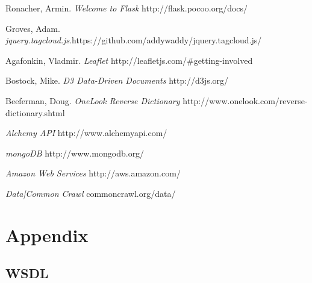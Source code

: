 \documentclass[conference]{IEEEtran}
\begin{document}
\begin{thebibliography}{1}
Ronacher, Armin. \emph{Welcome to Flask} http://flask.pocoo.org/docs/

Groves, Adam. \emph{jquery.tagcloud.js}.https://github.com/addywaddy/jquery.tagcloud.js/

Agafonkin, Vladmir. \emph{Leaflet} http://leafletjs.com/\#getting-involved

Bostock, Mike. \emph{D3 Data-Driven Documents} http://d3js.org/

Beeferman, Doug. \emph{OneLook Reverse Dictionary} http://www.onelook.com/reverse-dictionary.shtml

\emph{Alchemy API} http://www.alchemyapi.com/

\emph{mongoDB} http://www.mongodb.org/

\emph{Amazon Web Services} http://aws.amazon.com/

\emph{Data|Common Crawl} commoncrawl.org/data/


\end{thebibliography}

\pagebreak

\onecolumn

\section{Appendix}


\subsection{WSDL}
\end{document}
